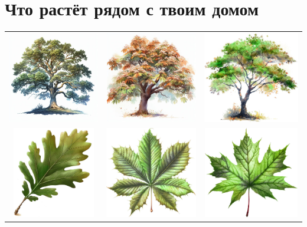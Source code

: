 \documentclass[a5paper,11pt]{memoir}
\begin{document}
\section*{Что растёт рядом с твоим домом}
\begin{table}[h]
	\begin{tabular}{ccc}
		\includegraphics[height=4cm]{images/tree-guide/oak-tree} & \includegraphics[height=4cm]{images/tree-guide/chestnut-tree} & \includegraphics[height=4cm]{images/tree-guide/maple-tree}             \\
		\includegraphics[height=4cm]{images/tree-guide/oak-leaf} & \includegraphics[height=4cm]{images/tree-guide/chestnut-leaf} & \includegraphics[height=4cm]{images/tree-guide/maple-leaf} \\		


\end{tabular}
\end{table}
\end{document}
